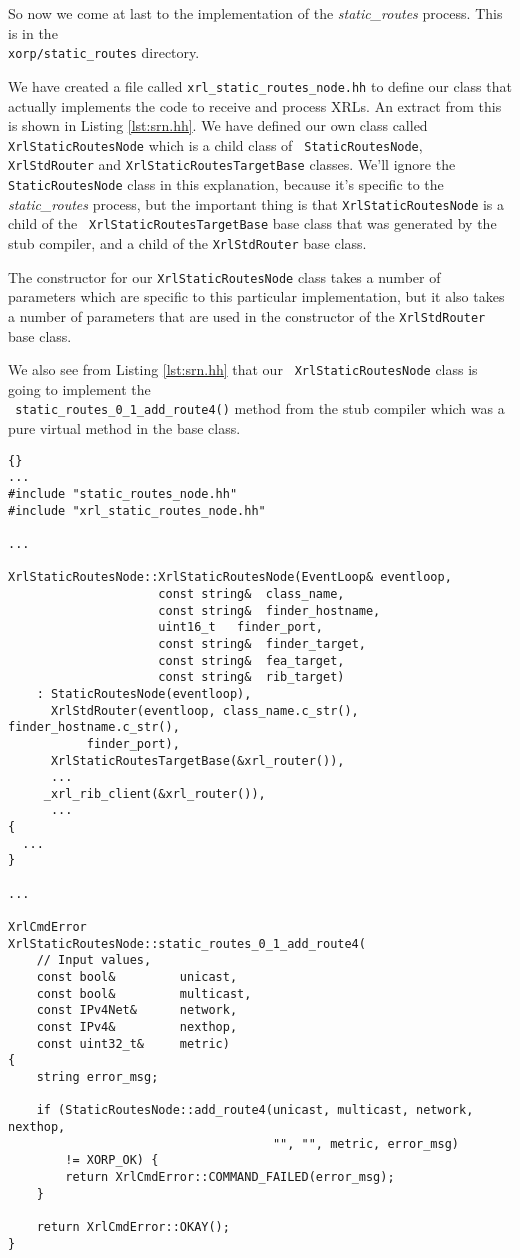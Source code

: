 \documentclass[11pt]{article}
\newcommand{\stt}{\tt\small}
\newcommand{\SRI}{{\it static\_routes}\xspace}
\begin{document}
So now we come at last to the implementation of the \SRI process.
This is in the \\
{\stt xorp/static\_routes} directory.  

We have created a file called {\stt xrl\_static\_routes\_node.hh} to
define our class that actually implements the code to receive and
process XRLs.  An extract from this is shown in Listing
\ref{lst:srn.hh}.  We have defined our own class called {\stt
XrlStaticRoutesNode} which is a child class of {\stt
StaticRoutesNode}, {\stt XrlStdRouter} and {\stt XrlStaticRoutesTargetBase}
classes.  We'll
ignore the {\stt StaticRoutesNode} class in this explanation, because
it's specific to the \SRI process, but the important thing is that
{\stt XrlStaticRoutesNode} is a child of the {\stt
XrlStaticRoutesTargetBase} base class that was generated by the stub
compiler, and a child of the {\stt XrlStdRouter} base class.

The constructor for our {\stt XrlStaticRoutesNode} class takes a
number of parameters which are specific to this particular
implementation, but it also takes a number of parameters that are used
in the constructor of the {\stt XrlStdRouter} base class.

We also see from Listing \ref{lst:srn.hh} that our {\stt
XrlStaticRoutesNode} class is going to implement the \\ {\stt
static\_routes\_0\_1\_add\_route4()} method from the stub compiler
which was a pure virtual method in the base class.

\newpage
\begin{lstlisting}[caption={Extracts from {\stt xorp/static\_routes/xrl\_static\_routes\_node.cc} %
                                     \label{lst:srn.cc} } ]{}
...
#include "static_routes_node.hh"
#include "xrl_static_routes_node.hh"

...

XrlStaticRoutesNode::XrlStaticRoutesNode(EventLoop&	eventloop,
					 const string&	class_name,
					 const string&	finder_hostname,
					 uint16_t	finder_port,
					 const string&	finder_target,
					 const string&	fea_target,
					 const string&	rib_target)
    : StaticRoutesNode(eventloop),
      XrlStdRouter(eventloop, class_name.c_str(), finder_hostname.c_str(),
		   finder_port),
      XrlStaticRoutesTargetBase(&xrl_router()),
      ...
     _xrl_rib_client(&xrl_router()),
      ...
{
  ...
}

...

XrlCmdError
XrlStaticRoutesNode::static_routes_0_1_add_route4(
    // Input values,
    const bool&         unicast,
    const bool&         multicast,
    const IPv4Net&      network,
    const IPv4&         nexthop,
    const uint32_t&     metric)
{
    string error_msg;

    if (StaticRoutesNode::add_route4(unicast, multicast, network, nexthop,
                                     "", "", metric, error_msg)
        != XORP_OK) {
        return XrlCmdError::COMMAND_FAILED(error_msg);
    }

    return XrlCmdError::OKAY();
}
\end{lstlisting}
\end{document}
